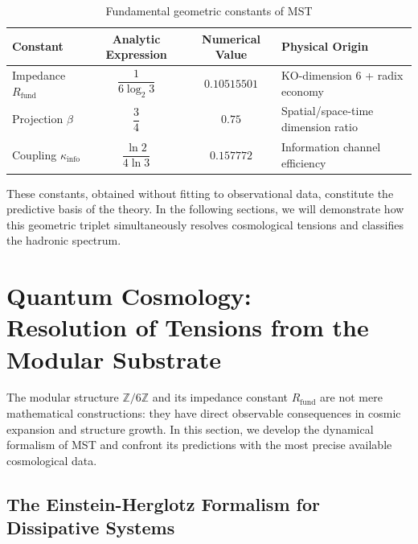 \documentclass[11pt, a4paper]{article}
\theoremstyle{plain}
\theoremstyle{definition}
\newcommand{\Zmod}{\mathbb{Z}/6\mathbb{Z}}
\newcommand{\Rfactor}{R_{\text{fund}}}
\newcommand{\Kinfo}{\kappa_{\text{info}}}
\begin{document}
\begin{table}[H]
\centering
\small %
\caption{Fundamental geometric constants of MST}
\label{tab:fundamental_constants}
\begin{tabular}{l c c p{4.5cm}} %
\toprule
\textbf{Constant} & \textbf{Analytic Expression} & \textbf{Numerical Value} & \textbf{Physical Origin} \\
\midrule
Impedance $\Rfactor$ & $\dfrac{1}{6\log_2 3}$ & $0.10515501$ & KO-dimension 6 + radix economy \\
\addlinespace %
Projection $\beta$ & $\dfrac{3}{4}$ & $0.75$ & Spatial/space-time dimension ratio \\
\addlinespace
Coupling $\Kinfo$ & $\dfrac{\ln 2}{4\ln 3}$ & $0.157772$ & Information channel efficiency \\
\bottomrule
\end{tabular}
\end{table}

These constants, obtained without fitting to observational data, constitute the predictive basis of the theory. In the following sections, we will demonstrate how this geometric triplet simultaneously resolves cosmological tensions and classifies the hadronic spectrum.


\section[Quantum Cosmology: Resolution of Tensions from the Modular Substrate]{Quantum Cosmology: \\ Resolution of Tensions from the Modular Substrate}
\label{sec:cosmology}

The modular structure $\Zmod$ and its impedance constant $\Rfactor$ are not mere mathematical constructions: they have direct observable consequences in cosmic expansion and structure growth. In this section, we develop the dynamical formalism of MST and confront its predictions with the most precise available cosmological data.

\subsection{The Einstein-Herglotz Formalism for Dissipative Systems}
\end{document}
